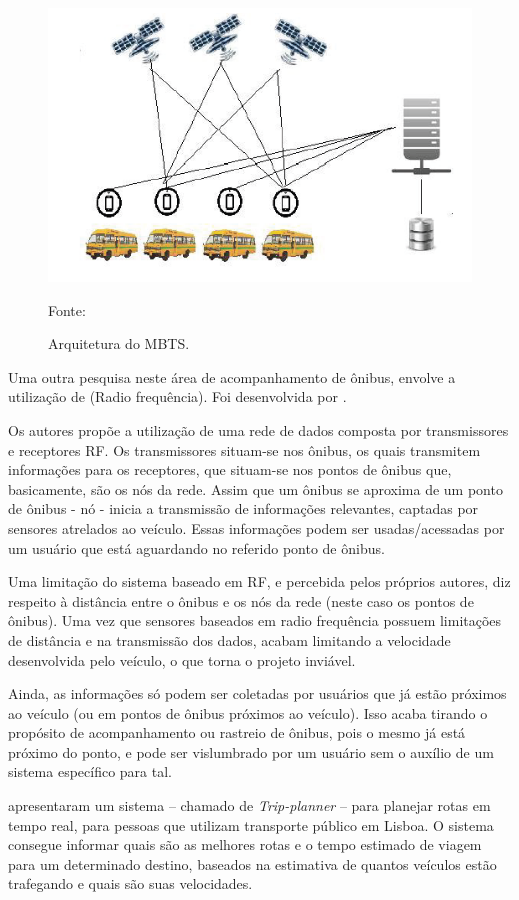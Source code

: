 \begin{figure}[h]
\begin{center}
    \includegraphics[width=0.6\columnwidth]{../figs/arch_mbts.png}
    \caption{Arquitetura do MBTS.}Fonte: \cite{sujatha}
    \label{fig:archMBTS}
\end{center}
\end{figure}

\newpage

Uma outra pesquisa neste área de acompanhamento de ônibus, envolve a utilização de  (Radio frequência). Foi desenvolvida por .

Os autores propõe a utilização de uma rede de dados composta por transmissores e receptores RF. Os transmissores situam-se nos ônibus, os quais transmitem informações para os receptores, que situam-se nos pontos de ônibus que, basicamente, são os nós da rede. Assim que um ônibus se aproxima de um ponto de ônibus - nó - inicia a transmissão de informações relevantes, captadas por sensores atrelados ao veículo. Essas informações podem ser usadas/acessadas por um usuário que está aguardando no referido ponto de ônibus. 

Uma limitação do sistema baseado em RF, e percebida pelos próprios autores, diz respeito à distância entre o ônibus e os nós da rede (neste caso os pontos de ônibus). Uma vez que sensores baseados em radio frequência possuem limitações de distância e na transmissão dos dados, acabam limitando a velocidade desenvolvida pelo veículo, o que torna o projeto inviável. 

Ainda, as informações só podem ser coletadas por usuários que já estão próximos ao veículo (ou em pontos de ônibus próximos ao veículo). Isso acaba tirando o propósito de acompanhamento ou rastreio de ônibus, pois o mesmo já está próximo do ponto, e pode ser vislumbrado por um usuário sem o auxílio de um sistema específico para tal.

 apresentaram um sistema -- chamado de \emph{Trip-planner} -- para planejar rotas em tempo real, para pessoas que utilizam transporte público em Lisboa. O sistema consegue informar quais são as melhores rotas e o tempo estimado de viagem para um determinado destino, baseados na estimativa de quantos veículos estão trafegando e quais são suas velocidades.

